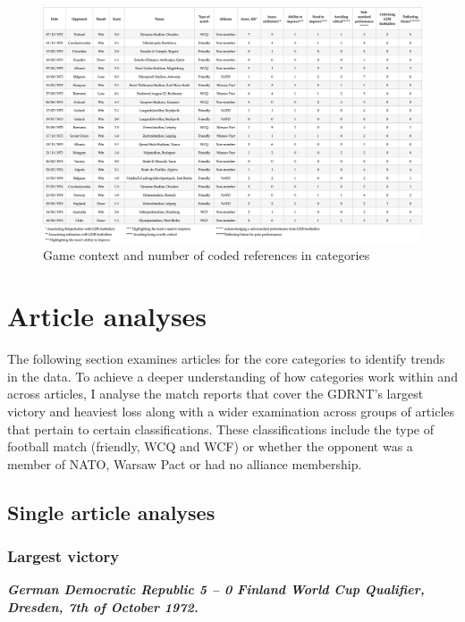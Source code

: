 \newpage
\begin{landscape}
\begin{figure}[!h]
\centering
\caption{Game context and number of coded references in categories}
\includegraphics[width=\linewidth]{mres/images/figure 3.2.png}
\end{figure}
\end{landscape}

\section*{Article analyses}

The following section examines articles for the core categories to identify trends in the data. To achieve a deeper understanding of how categories work within and across articles, I analyse the match reports that cover the GDRNT’s largest victory and heaviest loss along with a wider examination across groups of articles that pertain to certain classifications. These classifications include the type of football match (friendly, WCQ and WCF) or whether the opponent was a member of NATO, Warsaw Pact or had no alliance membership. 

\subsection*{Single article analyses}

\subsubsection*{Largest victory}

\textbf{\textit{German Democratic Republic 5 – 0 Finland
\newline World Cup Qualifier, Dresden, 7th of October 1972.}}

